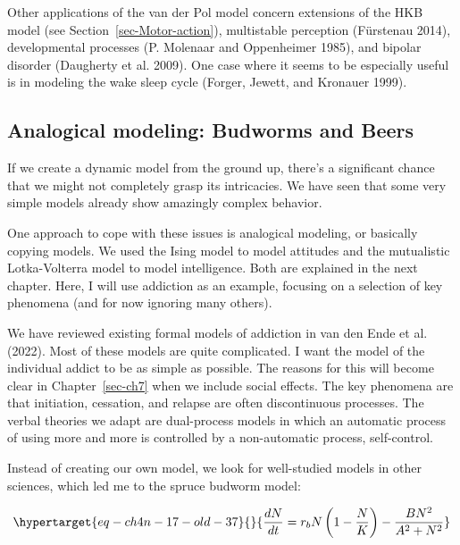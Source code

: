 \documentclass[
  a4paper,
  DIV=11,
  numbers=noendperiod]{scrreprt}
\begin{document}
Other applications of the van der Pol model concern extensions of the
HKB model (see Section~\ref{sec-Motor-action}), multistable perception
(Fürstenau 2014), developmental processes (P. Molenaar and Oppenheimer
1985), and bipolar disorder (Daugherty et al. 2009). One case where it
seems to be especially useful is in modeling the wake sleep cycle
(Forger, Jewett, and Kronauer 1999).

\hypertarget{sec-Analogical-modeling-Budworms-and-Beers}{%
\subsection{Analogical modeling: Budworms and
Beers}\label{sec-Analogical-modeling-Budworms-and-Beers}}

If we create a dynamic model from the ground up, there's a significant
chance that we might not completely grasp its intricacies. We have seen
that some very simple models already show amazingly complex behavior.

One approach to cope with these issues is analogical modeling, or
basically copying models. We used the Ising model to model attitudes and
the mutualistic Lotka-Volterra model to model intelligence. Both are
explained in the next chapter. Here, I will use addiction as an example,
focusing on a selection of key phenomena (and for now ignoring many
others).

We have reviewed existing formal models of addiction in van den Ende et
al. (2022). Most of these models are quite complicated. I want the model
of the individual addict to be as simple as possible. The reasons for
this will become clear in Chapter~\ref{sec-ch7} when we include social
effects. The key phenomena are that initiation, cessation, and relapse
are often discontinuous processes. The verbal theories we adapt are
dual-process models in which an automatic process of using more and more
is controlled by a non-automatic process, self-control.

Instead of creating our own model, we look for well-studied models in
other sciences, which led me to the spruce budworm model:

\begin{equation}\protect\hypertarget{eq-ch4n-17-old-37}{}{
\frac{dN}{dt} = r_{b}N\left( 1 - \frac{N}{K} \right) - \frac{BN^{2}}{A^{2} + N^{2}}
}\label{eq-ch4n-17-old-37}\end{equation}
\end{document}

